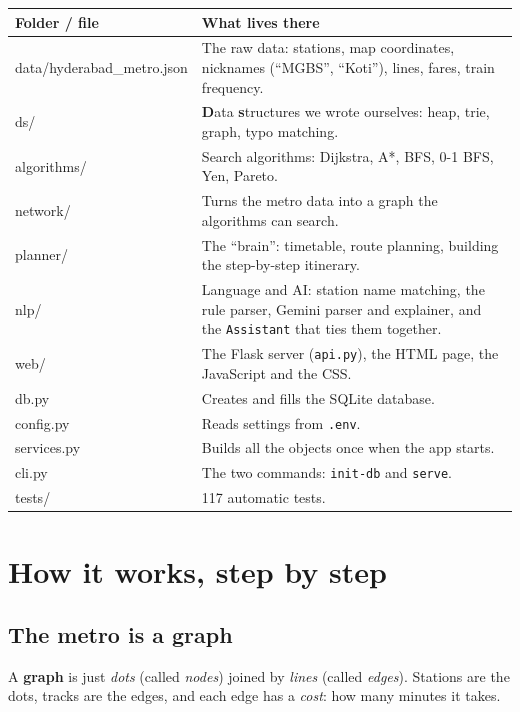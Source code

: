 \documentclass[11pt,a4paper]{article}
\begin{document}
\begin{tabularx}{\linewidth}{@{}>{\ttfamily\color{accent}}l X@{}}
\toprule
\normalfont\textbf{Folder / file} & \textbf{What lives there} \\
\midrule
data/hyderabad\_metro.json & The raw data: stations, map coordinates, nicknames (``MGBS'', ``Koti''), lines, fares, train frequency. \\
ds/ & \textbf{D}ata \textbf{s}tructures we wrote ourselves: heap, trie, graph, typo matching. \\
algorithms/ & Search algorithms: Dijkstra, A*, BFS, 0-1 BFS, Yen, Pareto. \\
network/ & Turns the metro data into a graph the algorithms can search. \\
planner/ & The ``brain'': timetable, route planning, building the step-by-step itinerary. \\
nlp/ & Language and AI: station name matching, the rule parser, Gemini parser and explainer, and the \texttt{Assistant} that ties them together. \\
web/ & The Flask server (\texttt{api.py}), the HTML page, the JavaScript and the CSS. \\
db.py & Creates and fills the SQLite database. \\
config.py & Reads settings from \texttt{.env}. \\
services.py & Builds all the objects once when the app starts. \\
cli.py & The two commands: \texttt{init-db} and \texttt{serve}. \\
tests/ & 117 automatic tests. \\
\bottomrule
\end{tabularx}

\section{How it works, step by step}

\subsection{The metro is a graph}

A \textbf{graph} is just \emph{dots} (called \emph{nodes}) joined by \emph{lines}
(called \emph{edges}). Stations are the dots, tracks are the edges, and each edge has a
\emph{cost}: how many minutes it takes.
\end{document}
